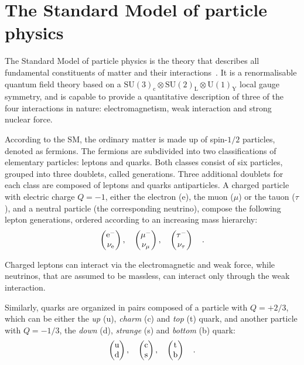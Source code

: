 \section{The Standard Model of particle physics}
\label{sec:SM}

The Standard Model of particle physics is the theory that describes all fundamental constituents of matter and their interactions~\cite{Halzen:1984mc}. It is a renormalisable quantum field theory based on a $\mathrm{SU(3)_c \otimes SU(2)_L \otimes U(1)_Y}$ local gauge symmetry, and is capable to provide a quantitative description of three of the four interactions in nature: electromagnetism, weak interaction and strong nuclear force. 

According to the SM, the ordinary matter is made up of spin-$1/2$ particles, denoted as fermions. The fermions are subdivided into two classifications of elementary particles: leptons and quarks. Both classes consist of six particles, grouped into three doublets, called generations. Three additional doublets for each class are composed of leptons and quarks antiparticles. A charged particle with electric charge $Q=-1$, either the electron (e), the muon ($\mu$) or the tauon ($\tau$), and a neutral particle (the corresponding neutrino), compose the following lepton generations, ordered according to an increasing mass hierarchy:
\begin{equation}
\label{eq:leptons}
\begin{pmatrix} \rm e^-       \\ \nu_{\rm e}      \end{pmatrix}, \quad
\begin{pmatrix} \mu^-     \\ \nu_{\mu}  \end{pmatrix}, \quad
\begin{pmatrix} \tau^-    \\ \nu_{\tau} \end{pmatrix}  \quad .
\end{equation}

Charged leptons can interact via the electromagnetic and weak force, while neutrinos, that are assumed to be massless, can interact only through the weak interaction.

Similarly, quarks are organized in pairs composed of a particle with $Q=+2/3$, which can be either the \emph{up} (u), \emph{charm} (c) and \emph{top} (t) quark, and another particle with $Q=-1/3$, the \emph{down} (d), \emph{strange} (s) and \emph{bottom} (b) quark:
\begin{equation}
\label{eq:quarks}
\begin{pmatrix} \rm u       \\ \rm d      \end{pmatrix}, \quad
\begin{pmatrix} \rm c       \\ \rm s      \end{pmatrix}, \quad
\begin{pmatrix} \rm t       \\ \rm b      \end{pmatrix}  \quad .
\end{equation}

